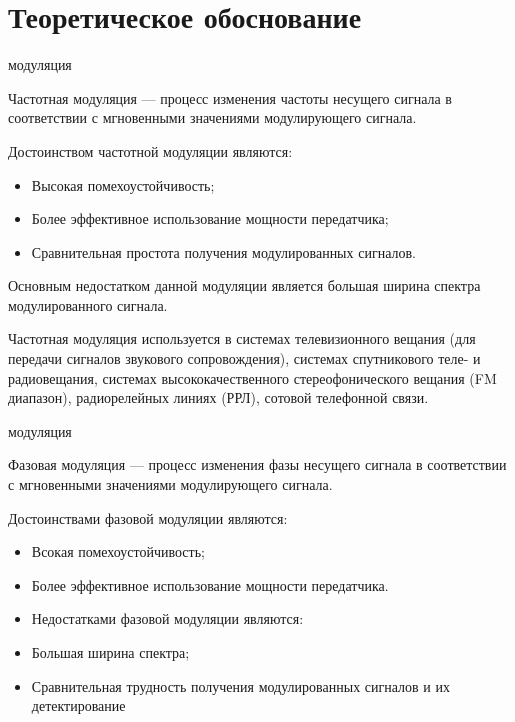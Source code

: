 \documentclass[a4paper,12pt]{article}
\begin{document}
\section{Теоретическое обоснование}

{ модуляция}

Частотная модуляция — процесс изменения частоты несущего сигнала в соответствии с мгновенными значениями модулирующего сигнала.

Достоинством частотной модуляции являются:
\begin{itemize}
	\item Высокая помехоустойчивость;
	\item Более эффективное использование мощности передатчика;
	\item Сравнительная простота получения модулированных сигналов.
\end{itemize}
Основным недостатком данной модуляции является большая ширина спектра модулированного сигнала.

Частотная модуляция используется в системах телевизионного вещания (для передачи сигналов звукового сопровождения), системах спутникового теле- и радиовещания, системах высококачественного стереофонического вещания (FM диапазон), радиорелейных линиях (РРЛ), сотовой телефонной связи.


{ модуляция}

Фазовая модуляция — процесс изменения фазы несущего сигнала в соответствии с мгновенными значениями модулирующего сигнала.

Достоинствами фазовой модуляции являются:
\begin{itemize}
	\item Всокая помехоустойчивость;
	\item Более эффективное использование мощности передатчика.
	\item Недостатками фазовой модуляции являются:
	\item Большая ширина спектра;
	\item Сравнительная трудность получения модулированных сигналов и их детектирование
\end{itemize}
\newpage
\end{document}
